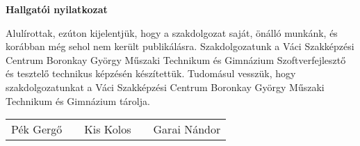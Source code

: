 \textbf{Hallgatói nyilatkozat}

Alulírottak, ezúton kijelentjük, hogy a szakdolgozat saját, önálló munkánk, és korábban még sehol nem került publikálásra.
Szakdolgozatunk a Váci Szakképzési Centrum Boronkay György Műszaki Technikum és Gimnázium Szoftverfejlesztő és tesztelő technikus képzésén készítettük.
Tudomásul vesszük, hogy szakdolgozatunkat a Váci Szakképzési Centrum Boronkay György Műszaki Technikum és Gimnázium tárolja.

\vspace*{3cm}

\begin{tabular}{ C{4cm} C{1cm} C{4cm} C{1cm} C{4cm} }
	Pék Gergő & & Kis Kolos & & Garai Nándor
\end{tabular}

\newpage


